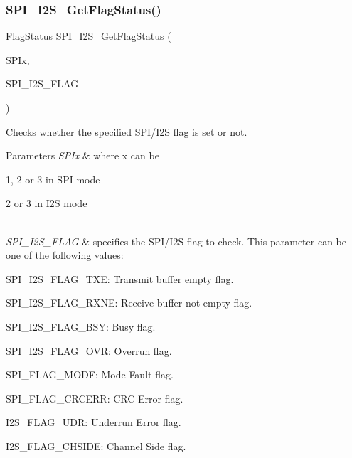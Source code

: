 \mbox{\label{group___s_p_i___exported___functions_ga1bd785d129e09c5734a876c8f2767204}} 
\subsubsection{\texorpdfstring{S\+P\+I\+\_\+\+I2\+S\+\_\+\+Get\+Flag\+Status()}{SPI\_I2S\_GetFlagStatus()}}
{\footnotesize\ttfamily \hyperlink{group___exported__types_ga89136caac2e14c55151f527ac02daaff}{Flag\+Status} S\+P\+I\+\_\+\+I2\+S\+\_\+\+Get\+Flag\+Status (\begin{DoxyParamCaption}\item[{\hyperlink{struct_s_p_i___type_def}{S\+P\+I\+\_\+\+Type\+Def} $\ast$}]{S\+P\+Ix,  }\item[{uint16\+\_\+t}]{S\+P\+I\+\_\+\+I2\+S\+\_\+\+F\+L\+AG }\end{DoxyParamCaption})}



Checks whether the specified S\+P\+I/\+I2S flag is set or not. 


\begin{DoxyParams}{Parameters}
{\em S\+P\+Ix} & where x can be
\begin{DoxyItemize}
\item 1, 2 or 3 in S\+PI mode
\item 2 or 3 in I2S mode 
\end{DoxyItemize}\\
\hline
{\em S\+P\+I\+\_\+\+I2\+S\+\_\+\+F\+L\+AG} & specifies the S\+P\+I/\+I2S flag to check. This parameter can be one of the following values\+: \begin{DoxyItemize}
\item S\+P\+I\+\_\+\+I2\+S\+\_\+\+F\+L\+A\+G\+\_\+\+T\+XE\+: Transmit buffer empty flag. \item S\+P\+I\+\_\+\+I2\+S\+\_\+\+F\+L\+A\+G\+\_\+\+R\+X\+NE\+: Receive buffer not empty flag. \item S\+P\+I\+\_\+\+I2\+S\+\_\+\+F\+L\+A\+G\+\_\+\+B\+SY\+: Busy flag. \item S\+P\+I\+\_\+\+I2\+S\+\_\+\+F\+L\+A\+G\+\_\+\+O\+VR\+: Overrun flag. \item S\+P\+I\+\_\+\+F\+L\+A\+G\+\_\+\+M\+O\+DF\+: Mode Fault flag. \item S\+P\+I\+\_\+\+F\+L\+A\+G\+\_\+\+C\+R\+C\+E\+RR\+: C\+RC Error flag. \item I2\+S\+\_\+\+F\+L\+A\+G\+\_\+\+U\+DR\+: Underrun Error flag. \item I2\+S\+\_\+\+F\+L\+A\+G\+\_\+\+C\+H\+S\+I\+DE\+: Channel Side flag. \end{DoxyItemize}
\\
\hline
\end{DoxyParams}

